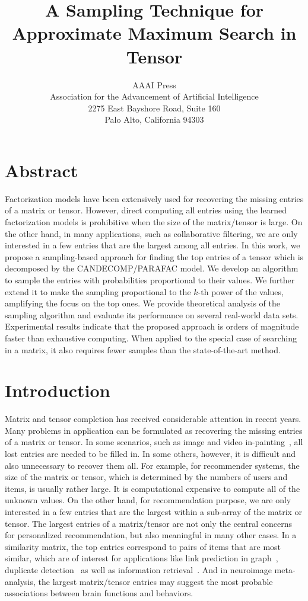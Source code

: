 \documentclass[letterpaper]{article}
\title{A Sampling Technique for Approximate Maximum Search in Tensor}
\author{AAAI Press\\
Association for the Advancement of Artificial Intelligence\\
2275 East Bayshore Road, Suite 160\\
Palo Alto, California 94303\\
}
\begin{document}
\maketitle
\section{Abstract}
Factorization models have been extensively used for 
recovering the missing entries of a matrix or tensor. 
However, direct computing all entries 
using the learned factorization models is prohibitive 
when the size of the matrix/tensor is large. 
On the other hand, in many applications, 
such as collaborative filtering, 
we are only interested in a few entries that are the largest among all entries. 
In this work, we propose a sampling-based approach for finding the top entries of a tensor 
which is decomposed by the CANDECOMP/PARAFAC model. 
We develop an algorithm to sample the entries with probabilities proportional to their values. 
We further extend it to make the sampling proportional to the $k$-th power of the values, 
amplifying the focus on the top ones. 
We provide theoretical analysis of the sampling algorithm and evaluate its performance on several real-world data sets. 
Experimental results indicate that the proposed approach is orders of magnitude faster than exhaustive computing. 
When applied to the special case of searching in a matrix, 
it also requires fewer samples than the state-of-the-art method.

\section{Introduction}
Matrix and tensor completion has received considerable attention in recent years. 
Many problems in application can be formulated 
as recovering the missing entries of a matrix or tensor. 
In some scenarios, such as image and video in-painting~\cite{Ankita14}, 
all lost entries are needed to be filled in. 
In some others, however, it is difficult and also unnecessary to recover them all. 
For example, for recommender systems, the size of the matrix or tensor, 
which is determined by the numbers of users and items, is usually rather large. 
It is computational expensive to compute all of the unknown values. 
On the other hand, for recommendation purpose, 
we are only interested in a few entries that are the largest within a sub-array of the matrix or tensor. 
The largest entries of a matrix/tensor are not only the central concerns for personalized recommendation, 
but also meaningful in many other cases. 
In a similarity matrix, the top entries correspond to pairs of items that are most similar, 
which are of interest for applications like link prediction in graph~\cite{LibenNowell07}, 
duplicate detection~\cite{Ke2010} as well as information retrieval~\cite{Salton03IR}. 
And in neuroimage meta-analysis, 
the largest matrix/tensor entries may suggest the most probable associations between brain functions and behaviors.
\end{document}
